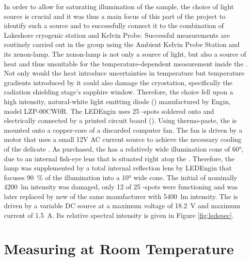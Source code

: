 In order to allow for saturating illumination of the sample, the choice of light source is crucial and it was thus a main focus of this part of the project to identify such a source and to successfully connect it to the combination of Lakeshore cryogenic station and \McA{} Kelvin Probe. Successful \spv{} measurements are routinely carried out in the group using the Ambient Kelvin Probe Station and its xenon-lamp. The xenon-lamp is not only a source of light, but also a source of heat and thus unsuitable for the temperature-dependent measurement inside the \McA{}. Not only would the heat introduce uncertainties in temperature but temperature gradients introduced by it could also damage the cryostation, specifically the radiation shielding stage's sapphire window. Therefore, the choice fell upon a high intensity, natural-white light emitting diode (\led{}) manufactured by \led{} Engin, model LZP-00CW0R. The LEDEngin \led{} uses 25 \led{}-spots soldered onto and electrically connected by a printed circuit board (\pcb{}). Using thermo-paste, the \led{} is mounted onto a copper-core of a discarded computer fan. The fan is driven by a motor that uses a small 12V AC current source to achieve the necessary cooling of the delicate \led{}. As purchased, the \led{} has a relatively wide illumination cone of \ang{60}, due to an internal fish-eye lens that is situated right atop the \pcb{}. Therefore, the lamp was supplemented by a total internal reflection lens by LEDEngin that focuses \SI{90}{\percent} of the illumination into a \ang{10} wide cone. The initial \led{} of nominally \SI{4200}{\lumen} intensity was damaged, only 12 of 25 \led{}-spots were functioning and was later replaced by new \led{} of the same manufacturer with \SI{5400}{\lumen} intensity. The \led{} is driven by a variable DC source at a maximum voltage of \SI{18.2}{\volt} and maximum current of \SI{1.5}{\ampere}. Its relative spectral intensity is given in Figure \ref{fig:ledspec}.


\section{Measuring \cpd{} at Room Temperature}
